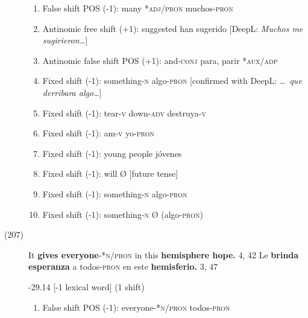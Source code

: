 \documentclass[output=paper]{langsci/langscibook}
\begin{document}
\begin{description}
    \begin{enumerate}
      \item False shift POS (-1): many *\textsc{adj/pron} \rightarrow muchos-\textsc{pron}
      \item Antinomic free shift (+1): suggested \rightarrow han sugerido [DeepL: \textit{Muchos me sugirieron\dots}]
      \item Antinomic false shift POS (+1): and-\textsc{conj} \rightarrow para, parir *\textsc{aux/adp}
      \item Fixed shift (-1): something-\textsc{n} \rightarrow algo-\textsc{pron} [confirmed with DeepL: \textit{\dots\ que derribara algo\dots}]
      \item Fixed shift (-1): tear\textsc{-v} down-\textsc{adv} \rightarrow destruya\textsc{-v}
      \item Fixed shift (-1): am\textsc{-v} \rightarrow yo-\textsc{pron}
      \item Fixed shift (-1): young people \rightarrow jóvenes
      \item Fixed shift (-1): will \rightarrow Ø [future tense]
      \item Fixed shift (-1): something\textsc{-n} \rightarrow algo-\textsc{pron}
      \item Fixed shift (-1): something\textsc{-n} \rightarrow Ø (algo-\textsc{pron)}
    \end{enumerate}

  \item[(207)] It \textbf{gives everyone}\textsc{-*n/pron} in this \textbf{hemisphere hope.} 4, 42 \rightarrow Le \textbf{brinda esperanza} a todos\textsc{-pron} en este \textbf{hemisferio.} 3, 47

    -29.14 [-1 lexical word] (1 shift)

    \begin{enumerate}
      \item False shift POS (-1): everyone\textsc{-*n/pron} \rightarrow todos-\textsc{pron}
    \end{enumerate}
\end{description}
\end{document}
